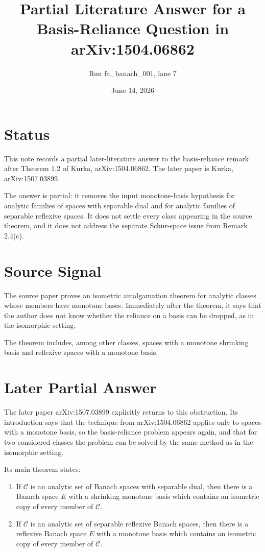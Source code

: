 \documentclass[11pt]{article}
\title{Partial Literature Answer for a Basis-Reliance Question in arXiv:1504.06862}
\author{Run fa\_banach\_001, lane 7}
\date{June 14, 2026}
\begin{document}
\maketitle

\section*{Status}

This note records a partial later-literature answer to the basis-reliance
remark after Theorem 1.2 of Kurka, arXiv:1504.06862. The later paper is
Kurka, arXiv:1507.03899.

The answer is partial: it removes the input monotone-basis hypothesis for
analytic families of spaces with separable dual and for analytic families of
separable reflexive spaces. It does not settle every class appearing in the
source theorem, and it does not address the separate Schur-space issue from
Remark 2.4(c).

\section*{Source Signal}

The source paper proves an isometric amalgamation theorem for analytic classes
whose members have monotone bases. Immediately after the theorem, it says that
the author does not know whether the reliance on a basis can be dropped, as in
the isomorphic setting.

The theorem includes, among other classes, spaces with a monotone shrinking
basis and reflexive spaces with a monotone basis.

\section*{Later Partial Answer}

The later paper arXiv:1507.03899 explicitly returns to this obstruction. Its
introduction says that the technique from arXiv:1504.06862 applies only to
spaces with a monotone basis, so the basis-reliance problem appears again, and
that for two considered classes the problem can be solved by the same method as
in the isomorphic setting.

Its main theorem states:
\begin{enumerate}
\item If $\mathcal C$ is an analytic set of Banach spaces with separable dual,
then there is a Banach space $E$ with a shrinking monotone basis which contains
an isometric copy of every member of $\mathcal C$.
\item If $\mathcal C$ is an analytic set of separable reflexive Banach spaces,
then there is a reflexive Banach space $E$ with a monotone basis which contains
an isometric copy of every member of $\mathcal C$.
\end{enumerate}
\end{document}

